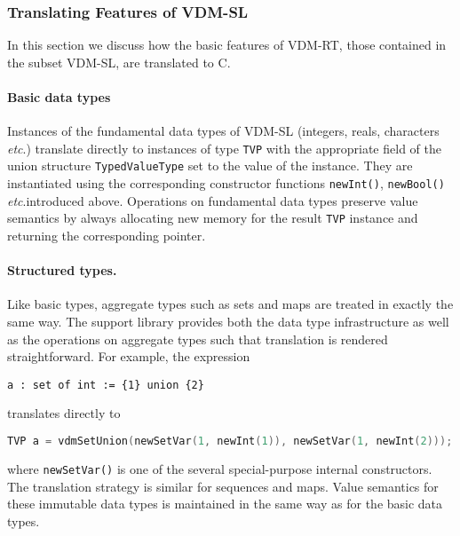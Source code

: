 \subsubsection{Translating Features of VDM-SL}
In this section we discuss how the basic features of VDM-RT, those contained in the subset VDM-SL, are translated to C.
%
\paragraph{Basic data types}
Instances of the fundamental data types of VDM-SL (integers, reals, characters \emph{etc}.\@) translate directly to instances of type \texttt{TVP} with the appropriate field of the union structure \texttt{TypedValueType} set to the value of the instance.
%
They are instantiated using the corresponding constructor functions \texttt{newInt()}, \texttt{newBool()} \emph{etc}.\@ introduced above.
%
Operations on fundamental data types preserve value semantics by always allocating new memory for the result \texttt{TVP} instance and returning the corresponding pointer.
%
\paragraph{Structured types.}
Like basic types, aggregate types such as sets and maps are treated in exactly the same way.
%
The support library provides both the data type infrastructure as well as the operations on aggregate types such that translation is rendered straightforward.
%
For example, the expression
%
%
%
\begin{lstlisting}[language=VDM++,frame=tlbr]
a : set of int := {1} union {2}
\end{lstlisting}
%
%
%
translates directly to 
%
%
%
\begin{lstlisting}[language=C,frame=tlbr]
TVP a = vdmSetUnion(newSetVar(1, newInt(1)), newSetVar(1, newInt(2)));
\end{lstlisting}
%
%
%
where \texttt{newSetVar()} is one of the several special-purpose internal constructors.
%
The translation strategy is similar for sequences and maps.
%
Value semantics for these immutable data types is maintained in the same way as for the basic data types.
%
%
%
